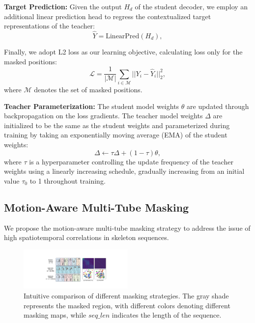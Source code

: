\noindent \textbf{Target Prediction:}
Given the output $H_d$ of the student decoder, we employ an additional linear prediction head to
regress the contextualized target representations of the teacher:  
\begin{equation}
    \label{eq:target_pred}
    \hat{Y} = \text{LinearPred}(H_d),
\end{equation}

Finally, we adopt L2 loss as our learning objective, calculating loss only for the
masked positions:
\begin{equation}
    \label{eq:loss}
    \mathcal{L} = \frac{1}{|\mathcal{M}|}\sum_{i \in \mathcal{M}}||Y_i - \hat{Y}_i||_2^2,
\end{equation}
where $\mathcal{M}$ denotes the set of masked positions.

\noindent \textbf{Teacher Parameterization:}
The student model weights $\theta$ are updated through backpropagation on the loss
gradients. The teacher model weights $\Delta$ are initialized to be the same as the
student weights and parameterized during training by taking an exponentially moving
average (EMA) of the student weights:  
\begin{equation}
    \label{eq:ema}
    \Delta \leftarrow \tau\Delta + (1-\tau)\theta,
\end{equation}
where $\tau$ is a hyperparameter controlling the update frequency of the teacher
weights using a linearly increasing schedule, gradually increasing from an initial
value $\tau_0$ to 1 throughout training.

\subsection{Motion-Aware Multi-Tube Masking}
\label{sec:motion-aware_tube_masking}
We propose the motion-aware multi-tube masking strategy to address the issue of high
spatiotemporal correlations in skeleton sequences.

\begin{figure}
    \vspace{-10pt}
  \centering
  \includegraphics[width=0.5\textwidth]{figures/fig_masking_cmp.pdf} %
  \caption{
    Intuitive comparison of different masking strategies.
    The gray shade represents the masked region, with different
    colors denoting different masking maps, while $seq\_len$
    indicates the length of the sequence.
  }
    \label{fig:masking_cmp}
    \vspace{-10pt}
\end{figure}

